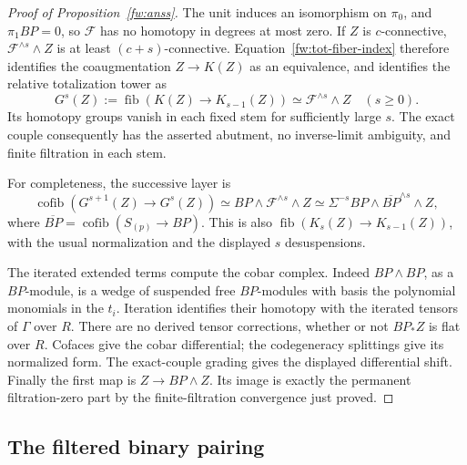 \begin{proof}[Proof of Proposition~\ref{fw:anss}]
The unit induces an isomorphism on $\pi_0$, and $\pi_1BP=0$, so
$\mathcal F$ has no homotopy in degrees at most zero.  If $Z$ is
$c$-connective, $\mathcal F^{\wedge s}\wedge Z$ is at least
$(c+s)$-connective.  Equation~\eqref{fw:tot-fiber-index} therefore
identifies the coaugmentation $Z\to K(Z)$ as an equivalence, and
identifies the relative totalization tower as
\begin{equation}
 G^s(Z):=\operatorname{fib}(K(Z)\longrightarrow K_{s-1}(Z))
        \simeq\mathcal F^{\wedge s}\wedge Z
        \quad(s\geq0).
 \label{fw:relative-tower}
\end{equation}
Its homotopy groups vanish in each fixed stem for sufficiently large
$s$.  The exact couple consequently has the asserted abutment, no
inverse-limit ambiguity, and finite filtration in each stem.

For completeness, the successive layer is
\begin{equation}
 \operatorname{cofib}(G^{s+1}(Z)\longrightarrow G^s(Z))
 \simeq BP\wedge\mathcal F^{\wedge s}\wedge Z
 \simeq\Sigma^{-s}BP\wedge\overline{BP}^{\wedge s}\wedge Z,
 \label{fw:tot-layer-index}
\end{equation}
where $\overline{BP}=\operatorname{cofib}(S_{(p)}\to BP)$.
This is also $\operatorname{fib}(K_s(Z)\to K_{s-1}(Z))$, with the
usual normalization and the displayed $s$ desuspensions.

The iterated extended terms compute the cobar complex.  Indeed
$BP\wedge BP$, as a $BP$-module, is a wedge of suspended free
$BP$-modules with basis the polynomial monomials in the $t_i$.
Iteration identifies their homotopy with the iterated tensors of
$\Gamma$ over $R$.  There are no derived tensor corrections, whether
or not $BP_*Z$ is flat over $R$.  Cofaces give the cobar differential;
the codegeneracy splittings give its normalized form.  The exact-couple
grading gives the displayed differential shift.  Finally the first
map is $Z\to BP\wedge Z$.  Its image is exactly the permanent
filtration-zero part by the finite-filtration convergence just proved.
\end{proof}

\subsection{The filtered binary pairing}\label{app:pairing}

